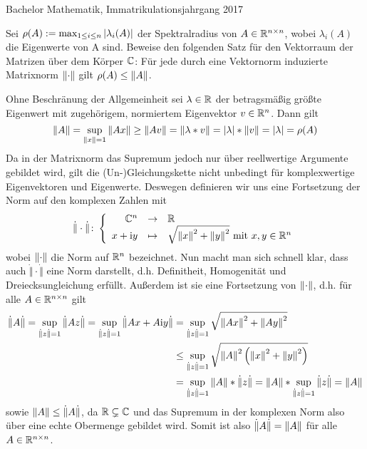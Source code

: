 \begin{exercisePage}
	\newcommand{\cnorm}[1]{\dot{\Vert} #1 \dot{\Vert}}
	\renewcommand{\i}{\mathrm{i}}
	
	\newcommand{\Norm}[1]{{\left\vert\kern-0.25ex\left\vert\kern-0.25ex\left\vert #1 \right\vert\kern-0.25ex\right\vert\kern-0.25ex\right\vert}} 
	
	\begin{flushright}
		\osfamily \textcolor{cdgray}{Bachelor Mathematik, Immatrikulationsjahrgang 2017}
	\end{flushright}
	\begin{exercise}
		Sei $\rho(A) \mathrel{:=} \max_{1 \leq i \leq n} \left| \lambda_i(A) \right|$ der Spektralradius von $A \in \mathbb{R}^{n \times n}$, wobei $\lambda_i(A)$ die Eigenwerte von
		A sind. Beweise den folgenden Satz für den Vektorraum der Matrizen über dem Körper $\mathbb{C}$: Für jede durch eine Vektornorm induzierte Matrixnorm $\left\lVert \cdot \right\rVert$ gilt $\rho(A) \leq \left\lVert A \right\rVert$.
	\end{exercise}

	Ohne Beschränung der Allgemeinheit sei $\lambda \in \mathbb{R}$ der betragsmäßig größte Eigenwert mit zugehörigem, normiertem Eigenvektor $v \in \mathbb{R}^n$. Dann gilt
	\begin{equation*}
		\left\lVert A \right\rVert = \sup_{\left\lVert x \right\rVert = 1} \left\lVert Ax \right\rVert \geq \left\lVert Av \right\rVert = \left\lVert \lambda * v \right\rVert = \left| \lambda \right| * \left\lVert v \right\rVert = \left| \lambda \right| = \rho(A)
	\end{equation*}
	Da in der Matrixnorm das Supremum jedoch nur über reellwertige Argumente gebildet wird, gilt die (Un-)Gleichungskette nicht unbedingt für komplexwertige Eigenvektoren und Eigenwerte. Deswegen definieren wir uns eine Fortsetzung der Norm auf den komplexen Zahlen mit
	\begin{equation*}
		\bigabb{\cnorm{\cdot}}{\C^n}{\R}{x+ \i y}{\sqrt{\norm{x}^2 + \norm{y}^2} \text{ mit } x,y \in \Rn}
	\end{equation*}
	wobei $\left\lVert \cdot \right\rVert$ die Norm auf $\mathbb{R}^n$ bezeichnet. Nun macht man sich schnell klar, dass auch $\cnorm{\cdot}$ eine Norm darstellt, d.h. Definitheit, Homogenität und Dreiecksungleichung erfüllt. Außerdem ist sie eine Fortsetzung von $\left\lVert \cdot \right\rVert$, d.h. für alle $A \in \mathbb{R}^{n \times n}$ gilt
	\begin{align*}
		\cnorm{A}
		= \sup_{\cnorm{z} = 1} \cnorm{Az} 
		= \sup_{\cnorm{z} = 1} \cnorm{Ax + A \i y} 
		&= \sup_{\cnorm{z} = 1} \sqrt{\norm{Ax}^2 + \norm{Ay}^2} \\
		&\leq \sup_{\cnorm{z} = 1} \sqrt{\norm{A}^2 \left( \norm{x}^2 + \norm{y}^2 \right) } \\
		&= \sup_{\cnorm{z} = 1} \norm{A} * \cnorm{z}
		= \norm{A} * \sup_{\cnorm{z} = 1} \cnorm{z}
		= \norm{A}
	\end{align*}
	sowie $\norm{A} \leq \cnorm{A}$, da $\mathbb{R} \subsetneq \mathbb{C}$ und das Supremum in der komplexen Norm also über eine echte Obermenge gebildet wird. Somit ist also $\cnorm{A} = \norm{A}$ für alle $A \in \mathbb{R}^{n \times n}$.
	

\end{exercisePage}
